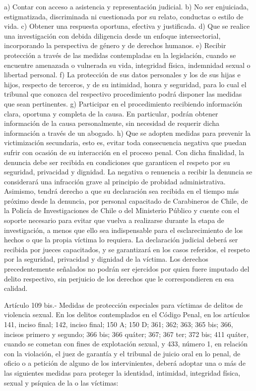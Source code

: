     a) Contar con acceso a asistencia y representación judicial.
    b) No ser enjuiciada, estigmatizada, discriminada ni cuestionada por su relato, conductas o estilo de vida.
    c) Obtener una respuesta oportuna, efectiva y justificada.
    d) Que se realice una investigación con debida diligencia desde un enfoque intersectorial, incorporando la perspectiva de género y de derechos humanos.
    e) Recibir protección a través de las medidas contempladas en la legislación, cuando se encuentre amenazada o vulnerada su vida, integridad física, indemnidad sexual o libertad personal.
    f) La protección de sus datos personales y los de sus hijas e hijos, respecto de terceros, y de su intimidad, honra y seguridad, para lo cual el tribunal que conozca del respectivo procedimiento podrá disponer las medidas que sean pertinentes.
    g) Participar en el procedimiento recibiendo información clara, oportuna y completa de la causa. En particular, podrán obtener información de la causa personalmente, sin necesidad de requerir dicha información a través de un abogado.
    h) Que se adopten medidas para prevenir la victimización secundaria, esto es, evitar toda consecuencia negativa que puedan sufrir con ocasión de su interacción en el proceso penal. Con dicha finalidad, la denuncia debe ser recibida en condiciones que garanticen el respeto por su seguridad, privacidad y dignidad. La negativa o renuencia a recibir la denuncia se considerará una infracción grave al principio de probidad administrativa.
    Asimismo, tendrá derecho a que su declaración sea recibida en el tiempo más próximo desde la denuncia, por personal capacitado de Carabineros de Chile, de la Policía de Investigaciones de Chile o del Ministerio Público y cuente con el soporte necesario para evitar que vuelva a realizarse durante la etapa de investigación, a menos que ello sea indispensable para el esclarecimiento de los hechos o que la propia víctima lo requiera. La declaración judicial deberá ser recibida por jueces capacitados, y se garantizará en los casos referidos, el respeto por la seguridad, privacidad y dignidad de la víctima.
    Los derechos precedentemente señalados no podrán ser ejercidos por quien fuere imputado del delito respectivo, sin perjuicio de los derechos que le correspondieren en esa calidad.

    Artículo 109 bis.- Medidas de protección especiales para víctimas de delitos de violencia sexual. En los delitos contemplados en el Código Penal, en los artículos 141, inciso final; 142, inciso final; 150 A; 150 D; 361; 362; 363; 365 bis; 366, incisos primero y segundo; 366 bis; 366 quáter; 367; 367 ter; 372 bis; 411 quáter, cuando se cometan con fines de explotación sexual, y 433, número 1, en relación con la violación, el juez de garantía y el tribunal de juicio oral en lo penal, de oficio o a petición de alguno de los intervinientes, deberá adoptar una o más de las siguientes medidas para proteger la identidad, intimidad, integridad física, sexual y psíquica de la o las víctimas:
     
